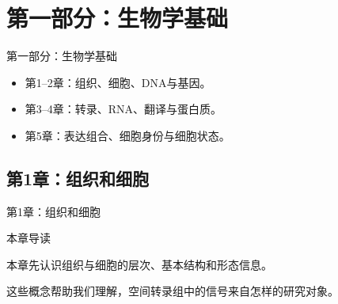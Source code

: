 \section{第一部分：生物学基础}

\begin{frame}{第一部分：生物学基础}\relax
{}\begin{itemize}\wideitems
\item 第1--2章：组织、细胞、DNA与基因。
\item 第3--4章：转录、RNA、翻译与蛋白质。
\item 第5章：表达组合、细胞身份与细胞状态。
\end{itemize}
\end{frame}

\subsection{第1章：组织和细胞}

\begin{frame}{第1章：组织和细胞}\relax
\vfill\begin{center}\begin{minipage}{.86\linewidth}
{\large\color{AcademicBlue}本章导读\par}\vspace{4mm}
{\Large 本章先认识组织与细胞的层次、基本结构和形态信息。\par\vspace{4mm}这些概念帮助我们理解，空间转录组中的信号来自怎样的研究对象。\par}
\end{minipage}\end{center}\vfill
{}
\end{frame}

